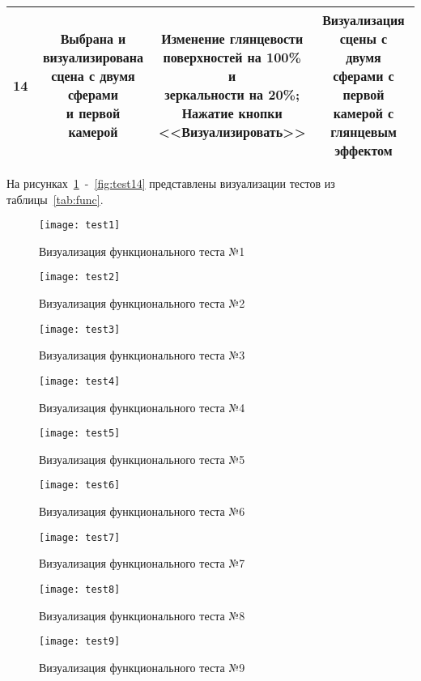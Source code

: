 \begin{longtable}{|r|c|c|c|}
	14 & \makecell{Выбрана и \\визуализирована \\сцена с двумя сферами\\и первой камерой} & \makecell{Изменение глянцевости\\поверхностей на 100\% и\\ зеркальности на 20\%;\\Нажатие кнопки\\<<Визуализировать>>} & \makecell{Визуализация сцены с \\двумя сферами с первой\\камерой с глянцевым\\ эффектом} \\ \hline
\end{longtable}

На рисунках~\ref{fig:test1}~-~\ref{fig:test14} представлены визуализации тестов из таблицы~\ref{tab:func}.
\begin{figure}[H]
	\centering
	\texttt{[image: test1]}
	\caption{Визуализация функционального теста №1}
	\label{fig:test1}
\end{figure}
\begin{figure}[H]
	\centering
	\texttt{[image: test2]}
	\caption{Визуализация функционального теста №2}
	\label{fig:test2}
\end{figure}
\begin{figure}[H]
	\centering
	\texttt{[image: test3]}
	\caption{Визуализация функционального теста №3}
	\label{fig:test3}
\end{figure}

\begin{figure}[H]
	\centering
	\texttt{[image: test4]}
	\caption{Визуализация функционального теста №4}
	\label{fig:test4}
\end{figure}
\begin{figure}[H]
	\centering
	\texttt{[image: test5]}
	\caption{Визуализация функционального теста №5}
	\label{fig:test5}
\end{figure}
\begin{figure}[H]
	\centering
	\texttt{[image: test6]}
	\caption{Визуализация функционального теста №6}
	\label{fig:test6}
\end{figure}

\begin{figure}[H]
	\centering
	\texttt{[image: test7]}
	\caption{Визуализация функционального теста №7}
	\label{fig:test7}
\end{figure}
\begin{figure}[H]
	\centering
	\texttt{[image: test8]}
	\caption{Визуализация функционального теста №8}
	\label{fig:test8}
\end{figure}
\begin{figure}[H]
	\centering
	\texttt{[image: test9]}
	\caption{Визуализация функционального теста №9}
	\label{fig:test9}
\end{figure}

